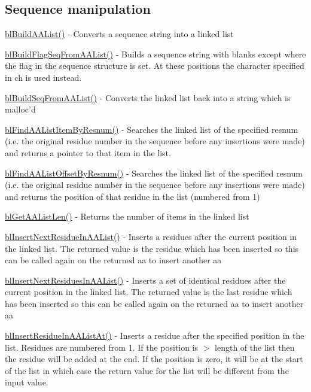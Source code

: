 \subsection*{Sequence manipulation }


\begin{DoxyItemize}
\item \hyperlink{aalist_8c_a4a942e598ffec1ffa3662effbe6853c0}{bl\-Build\-A\-A\-List()} -\/ Converts a sequence string into a linked list
\item \hyperlink{aalist_8c_affdffc769319fbf9d122fa753bb4b513}{bl\-Build\-Flag\-Seq\-From\-A\-A\-List()} -\/ Builds a sequence string with blanks except where the flag in the sequence structure is set. At these positions the character specified in ch is used instead.
\item \hyperlink{aalist_8c_a2f3ba11a61d656da739551a52c2836a7}{bl\-Build\-Seq\-From\-A\-A\-List()} -\/ Converts the linked list back into a string which is malloc'd
\item \hyperlink{aalist_8c_a800ee85e449ffdadc29e7691e7295b12}{bl\-Find\-A\-A\-List\-Item\-By\-Resnum()} -\/ Searches the linked list of the specified resnum (i.\-e. the original residue number in the sequence before any insertions were made) and returns a pointer to that item in the list.
\item \hyperlink{aalist_8c_a61021fd3b8916301d750cefce6a6d092}{bl\-Find\-A\-A\-List\-Offset\-By\-Resnum()} -\/ Searches the linked list of the specified resnum (i.\-e. the original residue number in the sequence before any insertions were made) and returns the position of that residue in the list (numbered from 1)
\item \hyperlink{aalist_8c_a56c0686a9a0be7f118b83de2fbc68c17}{bl\-Get\-A\-A\-List\-Len()} -\/ Returns the number of items in the linked list
\item \hyperlink{aalist_8c_a2384edcb4138647570dffa05649e5431}{bl\-Insert\-Next\-Residue\-In\-A\-A\-List()} -\/ Inserts a residues after the current position in the linked list. The returned value is the residue which has been inserted so this can be called again on the returned aa to insert another aa
\item \hyperlink{aalist_8c_adf719a32ce8680d302c3bad7990e6700}{bl\-Insert\-Next\-Residues\-In\-A\-A\-List()} -\/ Inserts a set of identical residues after the current position in the linked list. The returned value is the last residue which has been inserted so this can be called again on the returned aa to insert another aa
\item \hyperlink{aalist_8c_a3f39f73cc5f6a94b40865651dbe87d31}{bl\-Insert\-Residue\-In\-A\-A\-List\-At()} -\/ Inserts a residue after the specified position in the list. Residues are numbered from 1. If the position is $>$ length of the list then the residue will be added at the end. If the position is zero, it will be at the start of the list in which case the return value for the list will be different from the input value.

\end{DoxyItemize}

